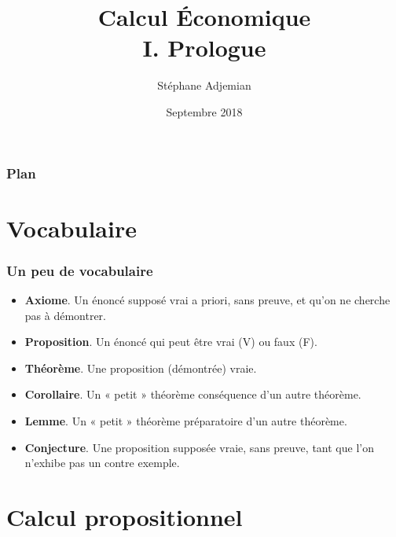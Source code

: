 \documentclass[10pt,notheorems]{beamer}
\theoremstyle{plain}
\theoremstyle{definition} %
\begin{document}
\title{Calcul Économique\\\small{I. Prologue}}
\author[S. Adjemian]{Stéphane Adjemian}
 \date{Septembre 2018}

\begin{frame}
  \titlepage{}
\end{frame}

\begin{frame}
  \frametitle{Plan}
  \tableofcontents
\end{frame}

\section{Vocabulaire}

\begin{frame}
  \frametitle{Un peu de vocabulaire}
  \begin{itemize}

  \item \textbf{Axiome}. Un énoncé supposé vrai a priori, sans preuve,
    et qu'on ne cherche pas à démontrer.\newline

  \item \textbf{Proposition}. Un énoncé qui peut être vrai (V) ou faux
    (F).\newline

  \item \textbf{Théorème}. Une proposition (démontrée) vraie.\newline

  \item \textbf{Corollaire}. Un « petit » théorème conséquence
    d'un autre théorème.\newline

  \item \textbf{Lemme}. Un « petit » théorème préparatoire d'un
    autre théorème.\newline

  \item \textbf{Conjecture}. Une proposition supposée vraie, sans
    preuve, tant que l'on n'exhibe pas un contre exemple.\newline

  \end{itemize}

\end{frame}

\section{Calcul propositionnel}
\end{document}
